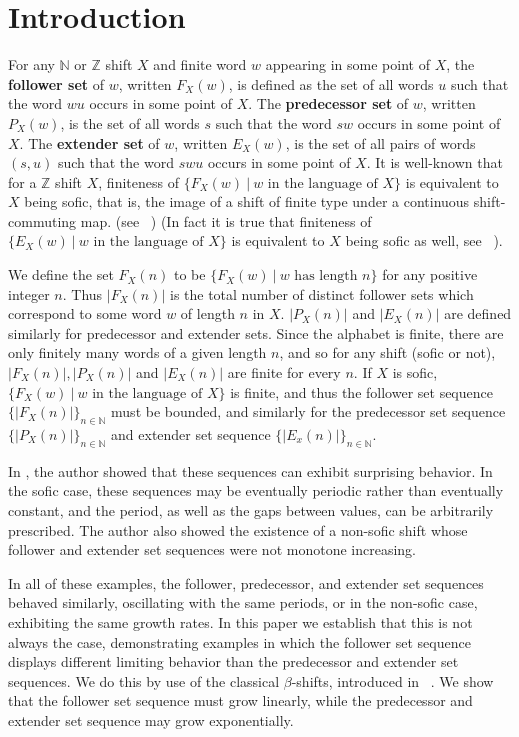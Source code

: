 \documentclass{amsart}
\theoremstyle{definition}
\numberwithin{equation}{section}
\begin{document}
\section{Introduction}
\label{intro}


For any $\mathbb{N}$ or $\mathbb{Z}$ shift $X$ and finite word $w$ appearing in some point of $X$, the \textbf{follower set} of $w$, written $F_X(w)$, is defined as the set of all words $u$ such that the word $wu$ occurs in some point of $X$. The \textbf{predecessor set} of $w$, written $P_X(w)$, is the set of all words $s$ such that the word $sw$ occurs in some point of $X$. The \textbf{extender set} of $w$, written $E_X(w)$, is the set of all pairs of words $(s,u)$ such that the word $swu$ occurs in some point of $X$. It is well-known that for a $\mathbb{Z}$ shift $X$, finiteness of $\{F_X(w) \ | \ w \text{ in the language of $X$} \}$ is equivalent to $X$ being sofic, that is, the image of a shift of finite type under a continuous shift-commuting map. (see ~\cite{LindMarcus}) (In fact it is true that finiteness of $\{E_X(w) \ | \ w \text{ in the language of $X$}\}$ is equivalent to $X$ being sofic as well, see ~\cite{OrmesPavlov}).

We define the set $F_X(n)$ to be $\{F_X(w) \ | \ w \text{ has length }n\}$ for any positive integer $n$. Thus $|F_X(n)|$ is the total number of distinct follower sets which correspond to some word $w$ of length $n$ in $X$. $|P_X(n)|$ and $|E_X(n)|$ are defined similarly for predecessor and extender sets. Since the alphabet is finite, there are only finitely many words of a given length $n$, and so for any shift (sofic or not), $|F_X(n)|, |P_X(n)|$ and $|E_X(n)|$ are finite for every $n$. If $X$ is sofic, $\{F_X(w) \ | \ w \text{ in the language of $X$} \}$ is finite, and thus the follower set sequence $\{|F_X(n)|\}_{n \in \mathbb{N}}$ must be bounded, and similarly for the predecessor set sequence $\{|P_X(n)|\}_{n \in \mathbb{N}}$ and extender set sequence $\{|E_x(n)|\}_{n \in \mathbb{N}}$. 

In \cite{French}, the author showed that these sequences can exhibit surprising behavior. In the sofic case, these sequences may be eventually periodic rather than eventually constant, and the period, as well as the gaps between values, can be arbitrarily prescribed. The author also showed the existence of a non-sofic shift whose follower and extender set sequences were not monotone increasing.

In all of these examples, the follower, predecessor, and extender set sequences behaved similarly, oscillating with the same periods, or in the non-sofic case, exhibiting the same growth rates. In this paper we establish that this is not always the case, demonstrating examples in which the follower set sequence displays different limiting behavior than the predecessor and extender set sequences. We do this by use of the classical $\beta$-shifts, introduced in ~\cite{Renyi}. We show that the follower set sequence must grow linearly, while the predecessor and extender set sequence may grow exponentially.
\end{document}
